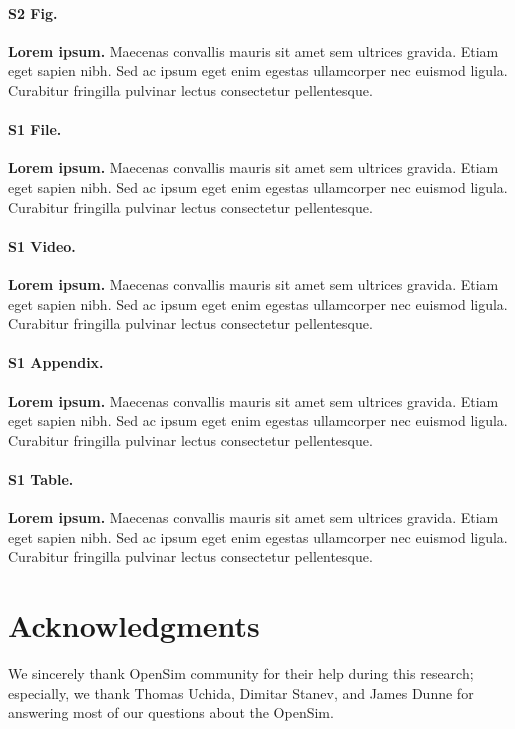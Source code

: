 \documentclass[10pt,letterpaper]{article}
\begin{document}
\paragraph*{S2 Fig.}
\label{S2_Fig}
{\bf Lorem ipsum.} Maecenas convallis mauris sit amet sem ultrices gravida. Etiam eget sapien nibh. Sed ac ipsum eget enim egestas ullamcorper nec euismod ligula. Curabitur fringilla pulvinar lectus consectetur pellentesque.

\paragraph*{S1 File.}
\label{S1_File}
{\bf Lorem ipsum.}  Maecenas convallis mauris sit amet sem ultrices gravida. Etiam eget sapien nibh. Sed ac ipsum eget enim egestas ullamcorper nec euismod ligula. Curabitur fringilla pulvinar lectus consectetur pellentesque.

\paragraph*{S1 Video.}
\label{S1_Video}
{\bf Lorem ipsum.}  Maecenas convallis mauris sit amet sem ultrices gravida. Etiam eget sapien nibh. Sed ac ipsum eget enim egestas ullamcorper nec euismod ligula. Curabitur fringilla pulvinar lectus consectetur pellentesque.

\paragraph*{S1 Appendix.}
\label{S1_Appendix}
{\bf Lorem ipsum.} Maecenas convallis mauris sit amet sem ultrices gravida. Etiam eget sapien nibh. Sed ac ipsum eget enim egestas ullamcorper nec euismod ligula. Curabitur fringilla pulvinar lectus consectetur pellentesque.

\paragraph*{S1 Table.}
\label{S1_Table}
{\bf Lorem ipsum.} Maecenas convallis mauris sit amet sem ultrices gravida. Etiam eget sapien nibh. Sed ac ipsum eget enim egestas ullamcorper nec euismod ligula. Curabitur fringilla pulvinar lectus consectetur pellentesque.

\section*{\textbf{Acknowledgments}}
We sincerely thank OpenSim community for their help during this research; especially, we thank Thomas Uchida, Dimitar Stanev, and James Dunne for answering most of our questions about the OpenSim.

\nolinenumbers

%
%
% 


\end{document}
